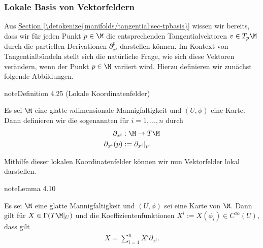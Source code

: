 \documentclass[letterpaper,10pt,english]{jupyterBook}
\begin{document}
\subsubsection{Lokale Basis von Vektorfeldern}
\label{\detokenize{manifolds/tangential:lokale-basis-von-vektorfeldern}}
\sphinxAtStartPar
Aus \hyperref[\detokenize{manifolds/tangential:sec-tpbasis}]{Section \ref{\detokenize{manifolds/tangential:sec-tpbasis}}} wissen wir bereits, dass wir für jeden Punkt \(p\in\M\) die entsprechenden Tangentialvektoren \(v\in T_p\M\) durch die partiellen Derivationen \(\partial_{x^i}^p\) darstellen können.
Im Kontext von Tangentialbündeln stellt sich die natürliche Frage, wie sich diese Vektoren verändern, wenn der Punkt \(p\in\M\) variiert wird.
Hierzu definieren wir zunächst folgende Abbildungen.
\label{manifolds/tangential:definition-32}
\begin{sphinxadmonition}{note}{Definition 4.25 (Lokale Koordinatenfelder)}



\sphinxAtStartPar
Es sei \(\M\) eine glatte \(n\)\sphinxhyphen{}dimensionale Mannigfaltigkeit und \((U,\phi)\) eine Karte.
Dann definieren wir die sogenannten  für \(i=1,\ldots,n\) durch
\begin{equation*}
\begin{split}\partial_{x^{i}}&:\M\to T\M\\
\partial_{x^{i}}(p)&:= \partial_{x^{i}}\rvert_p. \end{split}
\end{equation*}\end{sphinxadmonition}

\sphinxAtStartPar
Mithilfe dieser lokalen Koordinatenfelder können wir nun Vektorfelder lokal darstellen.
\label{manifolds/tangential:lem:localsections}
\begin{sphinxadmonition}{note}{Lemma 4.10}



\sphinxAtStartPar
Es sei \(\M\) eine glatte Mannigfaltigkeit und \((U,\phi)\) sei eine Karte von \(\M\).
Dann gilt für \(X\in\Gamma(T\M\rvert_U)\) und die Koeffizientenfunktionen \(X^i:=X(\phi_i)\in C^\infty(U)\), dass gilt
\begin{equation*}
\begin{split}X = \sum_{i=1}^n X^i \partial_{x^{i}}.\end{split}
\end{equation*}\end{sphinxadmonition}
\end{document}
